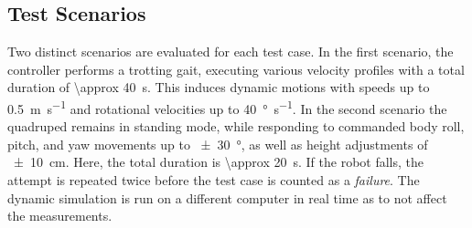 



 

\subsection{Test Scenarios}
Two distinct scenarios are evaluated for each test case. 
In the first scenario, the controller performs a trotting gait, executing various velocity profiles with a total duration of \qty{\approx 40}{\second}. 
This induces dynamic motions with speeds up to \qty{0.5}{\meter\per\second} and rotational velocities up to \qty{40}{\degree\per\second}. 
In the second scenario the quadruped remains in standing mode, while responding to commanded body roll, pitch, and yaw movements up to \qty{\pm 30}{\degree}, as well as height adjustments of \qty{\pm 10}{\centi\meter}. 
Here, the  total duration is \qty{\approx 20}{\second}. If the robot falls, the attempt is repeated twice before the test case is counted as a \textit{failure}. The dynamic simulation is run on a different computer in real time as to not affect the measurements.

    